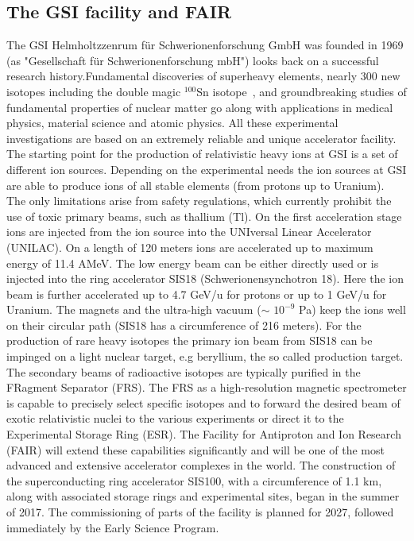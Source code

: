 \subsection{The GSI facility and FAIR}
The GSI Helmholtzzenrum f\"ur Schwerionenforschung GmbH was founded in 1969 (as "Gesellschaft f\"ur Schwerionenforschung mbH") looks back on a successful research history.Fundamental discoveries of superheavy elements, nearly 300 new isotopes including the double magic $^{100}$Sn isotope~\cite{hessberger2007gsi}, and groundbreaking studies of fundamental properties of nuclear matter go along with applications in medical physics, material science and atomic physics. All these experimental investigations are based on an extremely reliable and unique accelerator facility.\newline
The starting point for the production of relativistic heavy ions at GSI is a set of different ion sources. Depending on the experimental needs the ion sources at GSI are able to produce ions of all stable elements (from protons up to Uranium)\cite{ion_sources_web}. The only limitations arise from safety regulations, which currently prohibit the use of toxic primary beams, such as thallium (Tl).\newline
On the first acceleration stage ions are injected from the ion source into the UNIversal Linear Accelerator (UNILAC). On a length of 120 meters ions are accelerated up to maximum energy of 11.4 AMeV. The low energy beam can be either directly used or is injected into the ring accelerator SIS18 (Schwerionensynchotron 18). Here the ion beam is further accelerated up to 4.7 GeV/u for protons or up to 1 GeV/u for Uranium. The magnets and  the ultra-high vacuum ($\sim$ $10^{-9}$ Pa) keep the ions well on their circular path (SIS18 has a circumference of 216 meters)\cite{sis18_web}. For the production of rare heavy isotopes the primary ion beam from SIS18 can be impinged on a light nuclear target, e.g beryllium, the so called production target. The secondary beams of radioactive isotopes are typically purified in the FRagment Separator (FRS). The FRS as a high-resolution magnetic spectrometer is capable to precisely select specific isotopes and to forward the desired beam of exotic relativistic nuclei to the various experiments or direct it to the Experimental Storage Ring (ESR).\newline
The Facility for Antiproton and Ion Research (FAIR) will extend these capabilities significantly and will be one of the most advanced and extensive accelerator complexes in the world. The construction of the superconducting ring accelerator SIS100, with a circumference of 1.1 km, along with associated storage rings and experimental sites, began in the summer of 2017. The commissioning of parts of the facility is planned for 2027, followed immediately by the Early Science Program.\newline  
